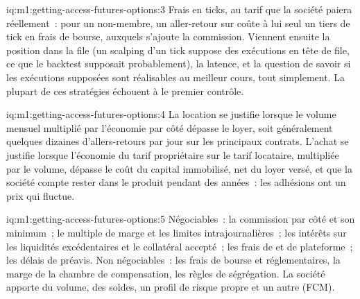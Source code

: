 \begin{solution}{iq:m1:getting-access-futures-options:3}
Frais en ticks, au tarif que la société paiera réellement~: pour un non-membre, un
aller-retour sur  coûte à lui seul un tiers de tick en frais de bourse, auxquels
s'ajoute la commission. Viennent ensuite la position dans la file (un scalping d'un tick suppose des exécutions en tête de
file, ce que le backtest supposait probablement), la latence, et la question de savoir si
les exécutions supposées sont réalisables au meilleur cours, tout simplement. La plupart de ces stratégies échouent à
le premier contrôle.
\end{solution}

\begin{solution}{iq:m1:getting-access-futures-options:4}
La location se justifie lorsque le volume mensuel multiplié par l'économie par côté dépasse le loyer,
soit généralement quelques dizaines d'allers-retours par jour sur les principaux contrats. L'achat se justifie lorsque
l'économie du tarif propriétaire sur le tarif locataire, multipliée par le volume, dépasse le coût du
capital immobilisé, net du loyer versé, et que la société compte rester dans le
produit pendant des années~: les adhésions ont un prix qui fluctue.
\end{solution}

\begin{solution}{iq:m1:getting-access-futures-options:5}
Négociables~: la commission par côté et son minimum~; le multiple de marge et
les limites intrajournalières~; les intérêts sur les liquidités excédentaires et le collatéral accepté~;
les frais de  et de plateforme~; les délais de préavis. Non négociables~: les frais de bourse et
réglementaires, la marge de la chambre de compensation, les règles de ségrégation. La société
apporte du volume, des soldes, un profil de risque propre et un autre  (FCM).
\end{solution}

